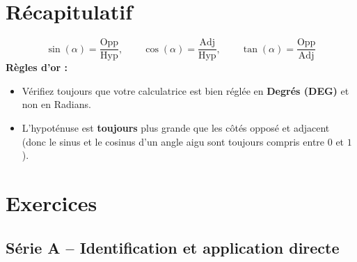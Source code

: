 \documentclass[11pt,a4paper]{article}
\begin{document}
\section{Récapitulatif}

\begin{tcolorbox}[colback=gray!6,colframe=gray!60!black,title={\bfseries À retenir}]
\[
\sin(\alpha) = \frac{\text{Opp}}{\text{Hyp}}, \qquad \cos(\alpha) = \frac{\text{Adj}}{\text{Hyp}}, \qquad \tan(\alpha) = \frac{\text{Opp}}{\text{Adj}}
\]
\textbf{Règles d'or :}
\begin{itemize}
  \item Vérifiez toujours que votre calculatrice est bien réglée en \textbf{Degrés (DEG)} et non en Radians.
  \item L'hypoténuse est \textbf{toujours} plus grande que les côtés opposé et adjacent (donc le sinus et le cosinus d'un angle aigu sont toujours compris entre $0$ et $1$).
\end{itemize}
\end{tcolorbox}

\newpage
\section{Exercices}

\subsection{Série A -- Identification et application directe}
\end{document}
